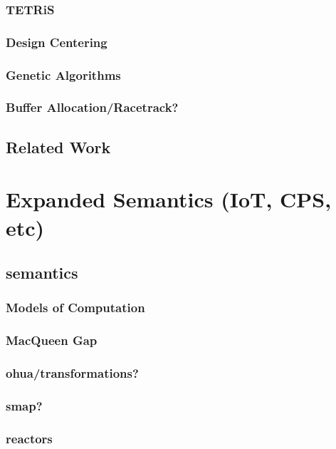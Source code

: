 \documentclass{report}
\begin{document}
\section{TETRiS}

\section{Design Centering}

\section{Genetic Algorithms}

\section{Buffer Allocation/Racetrack?}


\chapter{Related Work}



\part{Expanded Semantics (IoT, CPS, etc)}


\chapter{semantics}

\section{Models of Computation}

\section{MacQueen Gap}

\section{ohua/transformations?}

\section{smap?}

\section{reactors}

\end{document}
